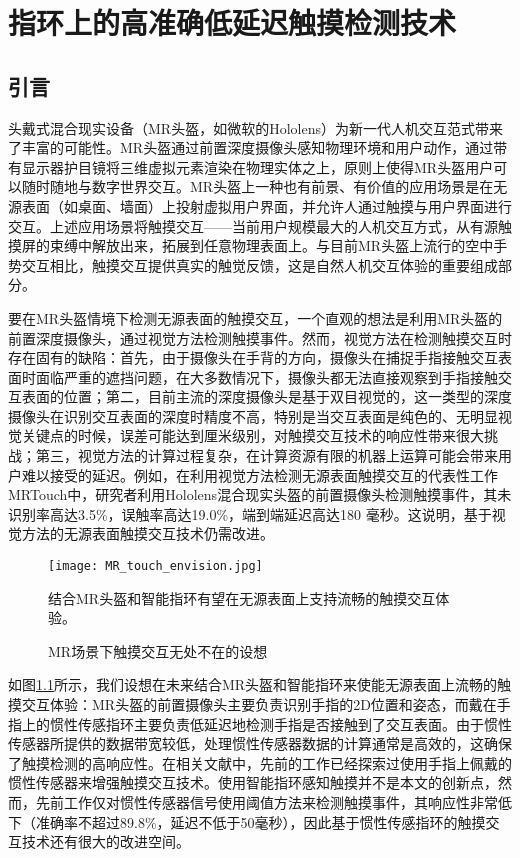 
\chapter{指环上的高准确低延迟触摸检测技术}\label{section:TappingRing}

\section{引言}

头戴式混合现实设备（MR头盔，如微软的Hololens\cite{hololens2}）为新一代人机交互范式带来了丰富的可能性。MR头盔通过前置深度摄像头感知物理环境和用户动作，通过带有显示器护目镜将三维虚拟元素渲染在物理实体之上，原则上使得MR头盔用户可以随时随地与数字世界交互。MR头盔上一种也有前景、有价值的应用场景是在无源表面（如桌面、墙面）上投射虚拟用户界面，并允许人通过触摸与用户界面进行交互。上述应用场景将触摸交互——当前用户规模最大的人机交互方式，从有源触摸屏的束缚中解放出来，拓展到任意物理表面上。与目前MR头盔上流行的空中手势交互相比，触摸交互提供真实的触觉反馈，这是自然人机交互体验的重要组成部分。

要在MR头盔情境下检测无源表面的触摸交互，一个直观的想法是利用MR头盔的前置深度摄像头，通过视觉方法检测触摸事件。然而，视觉方法在检测触摸交互时存在固有的缺陷：首先，由于摄像头在手背的方向，摄像头在捕捉手指接触交互表面时面临严重的遮挡问题，在大多数情况下，摄像头都无法直接观察到手指接触交互表面的位置；第二，目前主流的深度摄像头是基于双目视觉的，这一类型的深度摄像头在识别交互表面的深度时精度不高，特别是当交互表面是纯色的、无明显视觉关键点的时候，误差可能达到厘米级别，对触摸交互技术的响应性带来很大挑战；第三，视觉方法的计算过程复杂，在计算资源有限的机器上运算可能会带来用户难以接受的延迟。例如，在利用视觉方法检测无源表面触摸交互的代表性工作MRTouch\cite{xiao2018mrtouch}中，研究者利用Hololens混合现实头盔的前置摄像头检测触摸事件，其未识别率高达3.5\%，误触率高达19.0\%，端到端延迟高达180 毫秒。这说明，基于视觉方法的无源表面触摸交互技术仍需改进。

\begin{figure}
	\centering
	\texttt{[image: MR\_touch\_envision.jpg]}
	\caption*{结合MR头盔和智能指环有望在无源表面上支持流畅的触摸交互体验。}
	\caption{MR场景下触摸交互无处不在的设想}
	\label{fig:MR_touch_envision2}
\end{figure}

如图\ref{fig:MR_touch_envision2}所示，我们设想在未来结合MR头盔和智能指环来使能无源表面上流畅的触摸交互体验：MR头盔的前置摄像头主要负责识别手指的2D位置和姿态，而戴在手指上的惯性传感指环主要负责低延迟地检测手指是否接触到了交互表面。由于惯性传感器所提供的数据带宽较低，处理惯性传感器数据的计算通常是高效的，这确保了触摸检测的高响应性。在相关文献中，先前的工作已经探索过使用手指上佩戴的惯性传感器来增强触摸交互技术\cite{lam2002mids, oh2017anywheretouch, masson2017whichfingers}。使用智能指环感知触摸并不是本文的创新点，然而，先前工作仅对惯性传感器信号使用阈值方法来检测触摸事件，其响应性非常低下（准确率不超过89.8\%，延迟不低于50毫秒），因此基于惯性传感指环的触摸交互技术还有很大的改进空间。

